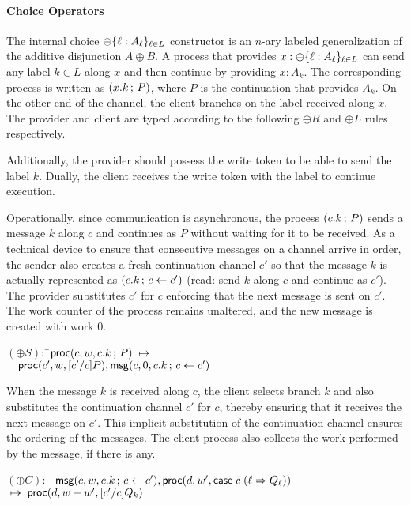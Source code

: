 \paragraph*{\textbf{Choice Operators}}
The internal choice $\oplus \{ \ell : A_\ell \}_{\ell \in L}$ constructor
is an $n$-ary labeled generalization of the additive disjunction $A \oplus B$.
A process that provides $x : \oplus \{ \ell : A_\ell \}_{\ell \in L}$ can send
any label $k \in L$ along $x$ and then continue by providing $x : A_k$. The
corresponding process is written as $(x.k \, ; \, P)$, where
$P$ is the continuation that provides $A_k$.
On the other end of the channel, the client branches on the label received along $x$.
The provider and client are typed according to the following $\oplus R$ and $\oplus L$
rules respectively.
Additionally, the provider should possess the write token to be able to send the
label $k$. Dually, the client receives the write token with the label to continue
execution.

Operationally, since communication is asynchronous, the process
$(c.k \, ; \, P)$ sends a message $k$
along $c$ and continues as $P$ without waiting for it to be received.
As a technical device to ensure that consecutive messages on a
channel arrive in order, the sender also creates a fresh continuation
channel $c'$ so that the message $k$ is actually represented as
$(c.k \, ; \, c \leftarrow c')$ (read: send $k$ along $c$ and
continue as $c'$). The provider substitutes $c'$ for $c$ enforcing
that the next message is sent on $c'$.
The work counter of the process remains unaltered, and the new message
is created with work $0$.
\begin{tabbing}
$(\oplus S) : $ \=$\mathsf{proc}(c, w, c.k \, ; \, P) \; \mapsto \;$ \qquad \qquad \qquad \qquad {}\\ 
\>$ \quad \mathsf{proc}(c', w, [c'/c]P),\mathsf{msg}(c, 0, c.k \, ; \, c \leftarrow c')$
\end{tabbing}
When the message $k$ is received along $c$, the client selects branch
$k$ and also substitutes the continuation channel $c'$ for $c$, thereby
ensuring that it receives the next message on $c'$. This implicit
substitution of the continuation channel ensures the ordering of the
messages.
The client process also collects the work performed by the message, if
there is any.
\begin{tabbing}
$(\oplus C) :$ \= $\mathsf{msg}(c, w, c.k \, ; \, c \leftarrow c'),
\mathsf{proc}(d, w', \mathsf{case} \; c \; (\ell \Rightarrow Q_\ell))$ \\ 
$\; \mapsto \; \mathsf{proc}(d, w+w',[c'/c]Q_k)$
\end{tabbing}


